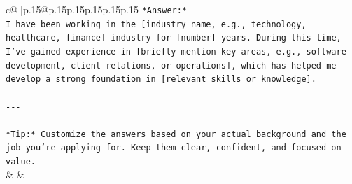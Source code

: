 \documentclass{article}
\begin{document}
{\begin{supertabular}{c@{$\;$}|p{.15\linewidth}@{}p{.15\linewidth}p{.15\linewidth}p{.15\linewidth}p{.15\linewidth}p{.15\linewidth}}
{{{\texttt{*Answer:*  } \\
\texttt{I have been working in the {[}industry name, e.g., technology, healthcare, finance{]} industry for {[}number{]} years. During this time, I’ve gained experience in {[}briefly mention key areas, e.g., software development, client relations, or operations{]}, which has helped me develop a strong foundation in {[}relevant skills or knowledge{]}.} \\
\\ 
\texttt{{-}{-}{-}} \\
\\ 
\texttt{*Tip:* Customize the answers based on your actual background and the job you're applying for. Keep them clear, confident, and focused on value.} \\
            }
        }
    }
    & & \\ \\


\end{supertabular}}
\end{document}
